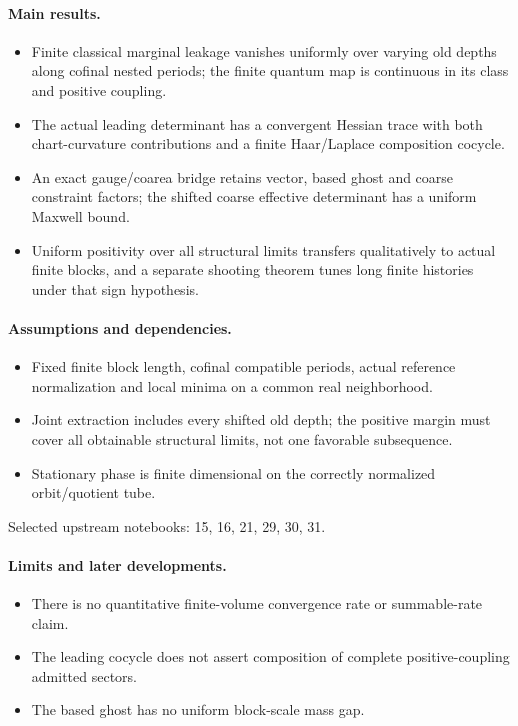 \paragraph{Main results.}
\begin{itemize}
\item Finite classical marginal leakage vanishes uniformly over varying old depths along cofinal nested periods; the finite quantum map is continuous in its class and positive coupling.
\item The actual leading determinant has a convergent Hessian trace with both chart-curvature contributions and a finite Haar/Laplace composition cocycle.
\item An exact gauge/coarea bridge retains vector, based ghost and coarse constraint factors; the shifted coarse effective determinant has a uniform Maxwell bound.
\item Uniform positivity over all structural limits transfers qualitatively to actual finite blocks, and a separate shooting theorem tunes long finite histories under that sign hypothesis.
\end{itemize}

\paragraph{Assumptions and dependencies.}
\begin{itemize}
\item Fixed finite block length, cofinal compatible periods, actual reference normalization and local minima on a common real neighborhood.
\item Joint extraction includes every shifted old depth; the positive margin must cover all obtainable structural limits, not one favorable subsequence.
\item Stationary phase is finite dimensional on the correctly normalized orbit/quotient tube.
\end{itemize}

Selected upstream notebooks: 15, 16, 21, 29, 30, 31.\par

\paragraph{Limits and later developments.}
\begin{itemize}
\item There is no quantitative finite-volume convergence rate or summable-rate claim.
\item The leading cocycle does not assert composition of complete positive-coupling admitted sectors.
\item The based ghost has no uniform block-scale mass gap.
\end{itemize}

